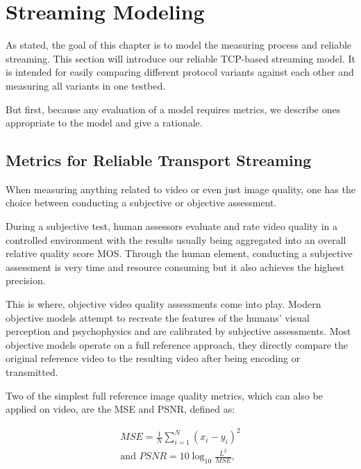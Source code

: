 \section{Streaming Modeling}
\label{c3:sec:modeling}

As stated, the goal of this chapter is to model the measuring process and reliable streaming. This section will introduce our reliable \gls{TCP}-based streaming model. It is intended for easily comparing different protocol variants against each other and measuring all variants in one testbed. 

But first, because any evaluation of a model requires metrics, we describe ones appropriate to the model and give a rationale.
 
\subsection{Metrics for Reliable Transport Streaming}
\label{c3:metrics}

When measuring anything related to video or even just image quality, one has the choice between conducting a subjective or objective assessment. 

During a subjective test, human assessors evaluate and rate video quality in a controlled environment with the results usually being aggregated into an overall relative quality score \gls{MOS}. Through the human element, conducting a subjective assessment is very time and resource consuming but it also achieves the highest precision.

This is where, objective video quality assessments come into play. Modern objective models attempt to recreate the features of the humans' visual perception and psychophysics and are calibrated by subjective assessments. Most objective models operate on a full reference approach, they directly compare the original reference video to the resulting video after being encoding or transmitted.

Two of the simplest full reference image quality metrics, which can also be applied on video, are the \gls{MSE} and \gls{PSNR}, defined as:

\begin{equation}
    \begin{aligned}
    MSE = \frac{1}{N} \sum_{i=1}^{N}(x_i - y_i)^2\\
    \text{and } PSNR = 10 \log_{10} \frac{L^2}{MSE},
    \end{aligned}
\end{equation}

